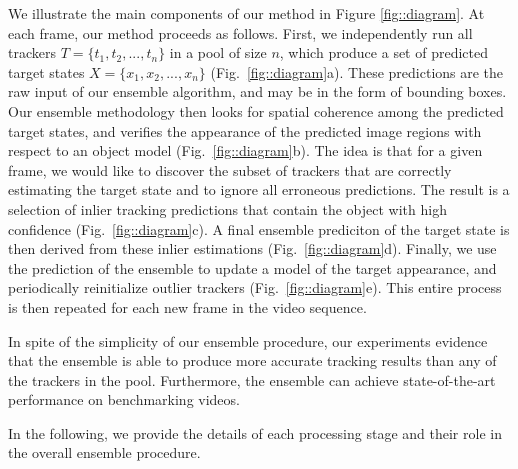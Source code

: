 We illustrate the main components of our method in
Figure \ref{fig::diagram}.
At each frame, our method proceeds as follows.
First, we independently run all trackers
$T = \{ t_1, t_2, ..., t_n \}$
in a pool of size $n$, which produce a set of predicted target
states
$X = \{ x_1, x_2, ..., x_n \}$ (Fig.~\ref{fig::diagram}a).
These predictions are the raw input of our ensemble algorithm,
and may be in the form of bounding boxes.
Our ensemble methodology then looks for spatial coherence among the predicted
target states, and verifies the appearance of the predicted image regions
with respect to an object model
(Fig.~\ref{fig::diagram}b). The idea is that for a given frame,
we would like to discover the subset of trackers that are correctly
estimating the target state and to ignore all erroneous predictions.
The result is a selection of inlier tracking predictions
that contain the object with high confidence
(Fig.~\ref{fig::diagram}c).
A final ensemble prediciton of the target state is then derived from
these inlier estimations (Fig.~\ref{fig::diagram}d).
Finally, we use the prediction of the ensemble to update a model of the
target appearance, and periodically reinitialize outlier trackers
(Fig.~\ref{fig::diagram}e).
This entire process is then repeated for each new frame in the video sequence.

In spite of the simplicity of our ensemble procedure, our experiments
evidence that the ensemble is able to produce more accurate tracking results
than any of the trackers in the pool. Furthermore, the ensemble can
achieve state-of-the-art performance on benchmarking videos.

In the following, we provide the details of each processing stage and their
role in the overall ensemble procedure.


